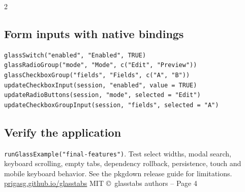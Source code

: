 \documentclass[9pt,a4paper]{article}
\begin{document}
\begin{multicols*}{2}
\subsection*{Form inputs with native bindings}
\begin{verbatim}
glassSwitch("enabled", "Enabled", TRUE)
glassRadioGroup("mode", "Mode", c("Edit", "Preview"))
glassCheckboxGroup("fields", "Fields", c("A", "B"))
updateCheckboxInput(session, "enabled", value = TRUE)
updateRadioButtons(session, "mode", selected = "Edit")
updateCheckboxGroupInput(session, "fields", selected = "A")
\end{verbatim}
\subsection*{Verify the application}
\verb|runGlassExample("final-features")|. Test select widths, modal search,
keyboard scrolling, empty tabs, dependency rollback, persistence, touch and
mobile keyboard behavior. See the pkgdown release guide for limitations.
\vfill
{\tiny\color{gtgray}
\href{https://prigasg.github.io/glasstabs/}{prigasg.github.io/glasstabs}
\hfill MIT \copyright\ glasstabs authors -- Page 4}
\end{multicols*}
\end{document}
